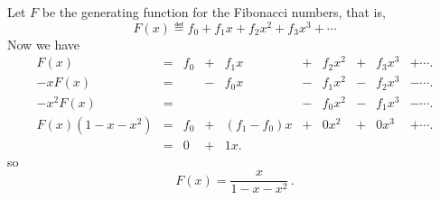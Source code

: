 \documentclass[handout]{mcs}
\begin{document}
Let $F$ be the generating function for the Fibonacci numbers, that is,
\[
F(x) \eqdef f_0 + f_1 x + f_2 x^2 + f_3 x^3 + \cdots
\]
Now we have
\[
\begin{array}{rcrcrcrcrcr}
F(x)     & = & f_0 & + & f_1  x & + & f_2 x^2 & + & f_3 x^3 &  + \cdots.\\
-xF(x)   & = &     & - & f_0  x & - & f_1 x^2 & - & f_2 x^3 &  - \cdots.\\
-x^2F(x) & = &     &   &        & - & f_0 x^2 & - & f_1 x^3 &  - \cdots.\\
\hline
F(x)(1-x-x^2) 
         & = & f_0 & + & (f_1-f_0) 
                              x & + &   0 x^2 & + &   0 x^3 &  + \cdots.\\
         & = &  0  & + &   1  x.
\end{array}
\]
so
\[
F(x) = \frac{x}{1 - x - x^2}\, .
\]
\end{document}

